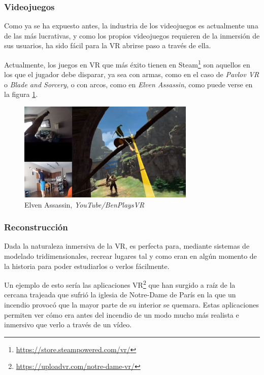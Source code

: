 \subsubsection{Videojuegos}

Como ya se ha expuesto antes, la industria de los videojuegos es actualmente una de las más lucrativas, y como los propios videojuegos requieren de la inmersión de sus usuarios, ha sido fácil para la \acs{VR} abrirse paso a través de ella.

Actualmente, los juegos en \acs{VR} que más éxito tienen en Steam\footnote{\url{https://store.steampowered.com/vr/}} son aquellos en los que el jugador debe disparar, ya sea con armas, como en el caso de \textit{Pavlov VR} o \textit{Blade and Sorcery}, o con arcos, como en \textit{Elven Assassin}, como puede verse en la figura \ref{fig:elven-assassin}.

\begin{figure}[!h]
\begin{center}
\includegraphics[width=0.75\textwidth]{imagenes/2/elven-assassin.jpg}
\caption{Elven Assassin, \textit{YouTube/BenPlaysVR}}
\label{fig:elven-assassin}
\end{center}
\end{figure}

\subsubsection{Reconstrucción}

Dada la naturaleza inmersiva de la \acs{VR}, es perfecta para, mediante sistemas de modelado tridimensionales, recrear lugares tal y como eran en algún momento de la historia para poder estudiarlos o verlos fácilmente.

Un ejemplo de esto sería las aplicaciones \acs{VR}\footnote{\url{https://uploadvr.com/notre-dame-vr/}} que han surgido a raíz de la cercana trajeada que sufrió la iglesia de Notre-Dame de París en la que un incendio provocó que la mayor parte de su interior se quemara. Estas aplicaciones permiten ver cómo era antes del incendio de un modo mucho más realista e inmersivo que verlo a través de un vídeo.

